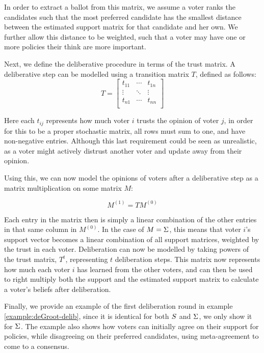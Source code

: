 In order to extract a ballot from this matrix, we assume a voter ranks the
candidates such that the most preferred candidate has the smallest distance
between the estimated support matrix for that candidate and her own. We
further allow this distance to be weighted, such that a voter may have one or
more policies their think are more important.

Next, we define the deliberative procedure in terms of the trust matrix. A
deliberative step can be modelled using a transition matrix $T$, defined as
follows:
\[ T=\begin{bmatrix} t_{11} & \cdots & t_{1n} \\ \vdots & \ddots &
                \vdots                   \\ t_{n1} & \cdots  & t_{nn} \\\end{bmatrix} \]

Here each $t_{ij}$ represents how much voter $i$ trusts the opinion of voter
$j$, in order for this to be a proper stochastic matrix, all rows must sum to
one, and have non-negative entries. Although this last requirement could be
seen as unrealistic, as a voter might actively distrust another voter and
update away from their opinion.

Using this, we can now model the opinions of voters after a deliberative step
as a matrix multiplication on some matrix $M$:

\begin{equation} M^{(1)} = TM^{(0)} \label{eq:update_degroot} \end{equation}

Each entry in the matrix then is simply a linear combination of the other
entries in that same column in $M^{(0)}$. In the case of $M = \Sigma$,
this means that voter $i$'s support vector becomes a linear combination of all
support matrices, weighted by the trust in each voter. Deliberation can now be
modelled by taking powers of the trust matrix, $T^{t}$, representing $t$
deliberation steps. This matrix now represents how much each voter $i$ has
learned from the other voters, and can then be used to right multiply both the
support and the estimated support matrix to calculate a voter's beliefs after
deliberation.

Finally, we provide an example of the first deliberation round in example
\ref{example:deGroot-delib}, since it is identical for both $S$ and
$\Sigma$, we only show it for $\Sigma$. The example also shows how
voters can initially agree on their support for policies, while disagreeing on
their preferred candidates, using meta-agreement to come to a consensus.

